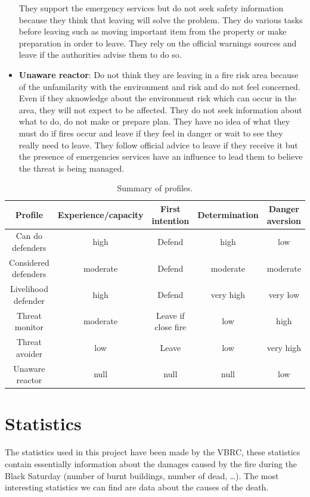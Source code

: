 \documentclass[12pt, a4paper]{memoir} %
\begin{document}
\begin{itemize}
			They support the emergency services but do not seek safety information because they think that leaving will solve the problem. They do various
			tasks before leaving such as moving important item from the property or make preparation in order to leave. They rely on the official
			warnings sources and leave if the authorities advise them to do so.
			\item \textbf{Unaware reactor}: Do not think they are leaving in a fire risk area because of the unfamilarity with the environment and risk
			and do not feel concerned. Even if they aknowledge about the environment risk which can occur in the area, they will not expect to be affected.
			They do not seek information about what to do, do not make or prepare plan. They have no idea of what they must do if fires occur and leave if
			they feel in danger or wait to see they really need to leave. They follow official advice to leave if they receive it but the presence of emergencies
			services have an influence to lead them to believe the threat is being managed.
		\end{itemize}

		\begin{table}
			\caption{Summary of profiles.}
			\begin{tabular}{|c|c|c|c|c|}
			  \hline
			  Profile & Experience/capacity & First intention & Determination & Danger aversion \\
			  \hline
			  Can do defenders & high & Defend & high & low\\
				\hline
			  Considered defenders & moderate & Defend & moderate & moderate\\
				\hline
				Livelihood defender & high & Defend & very high & very low\\
				\hline
				Threat monitor & moderate & Leave if close fire & low &  high\\
				\hline
				Threat avoider & low & Leave & low & very high\\
				\hline
				Unaware reactor & null & null & null & low\\
			  \hline
			\end{tabular}
		\end{table}

	\section{Statistics}

	The statistics used in this project have been made by the VBRC, these statistics contain essentially information about
	the damages caused by the fire during the Black Saturday (number of burnt buildings, number of dead, \dots). The most
	interesting statistics we can find are data about the causes of the death.
\end{document}
